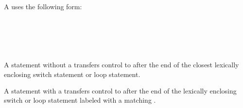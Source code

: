 \begin{Checking}
\end{Checking}


A  uses the following form:

\begin{Syntax}
	 \\
		  \\
		 \code{(} \SynOpt \code{)} \code{;}		
\end{Syntax}


\begin{Checking}
\end{Checking}



\begin{Syntax}
		 \SynOpt \code{;} \\
\end{Syntax}

\begin{Description}
A  statement without a  transfers control to after the end of the closest lexically enclosing switch statement or loop statement.

A  statement with a  transfers control to after the end of the lexically enclosing switch or loop statement labeled with a matching .
\end{Description}

